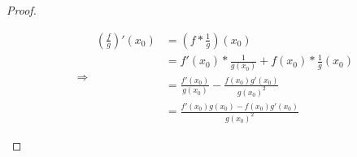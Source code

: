 \begin{proof}
\begin{enumerate}
\begin{equation*}
\begin{split}
            \end{split}
            \Rightarrow 
            \begin{split}
                (\frac{f}{g})'(x_0) &= (f * \frac{1}{g})(x_0) \\
                &= f'(x_0) * \frac{1}{g(x_0)} + f(x_0) * \frac{1}{g}(x_0) \\
                &= \frac{f'(x_0)}{g(x_0)} - \frac{f(x_0)g'(x_0)}{g(x_0)^2} \\
                &= \frac{f'(x_0)g(x_0) - f(x_0)g'(x_0)}{g(x_0)^2}
            \end{split}
        \end{equation*}
    \end{enumerate}
\end{proof}